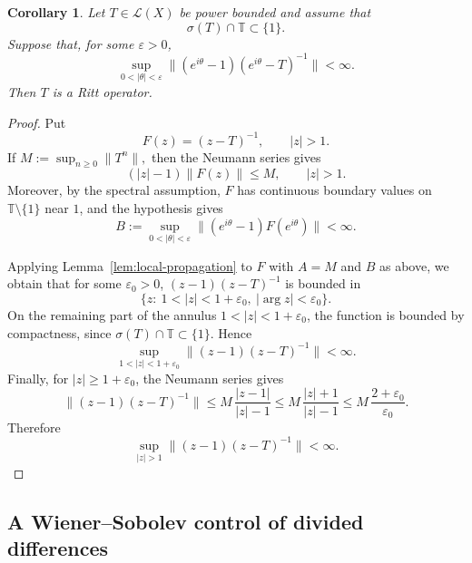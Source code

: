 \documentclass[11pt]{amsart}
\numberwithin{equation}{section}
\newtheorem{corollary}[theorem]{Corollary}
\theoremstyle{definition}
\theoremstyle{plain}
\def\T{\mathbb{T}}
\def\L{L}
\renewcommand{\L}{\mathcal L}
\begin{document}
\begin{corollary}
\label{cor:Lyubich-propagation}
Let \(T\in\L(X)\) be power bounded and assume that
\[
        \sigma(T)\cap\T\subset\{1\}.
\]
Suppose that, for some \(\varepsilon>0\),
\[
        \sup_{0<|\theta|<\varepsilon}
        \|(e^{i\theta}-1)(e^{i\theta}-T)^{-1}\|<\infty .
\]
Then \(T\) is a Ritt operator.
\end{corollary}

\begin{proof}
Put
\[
        F(z)=(z-T)^{-1},\qquad |z|>1.
\]
If
\(
        M:=\sup_{n\ge0}\|T^n\|,
\)
then the Neumann series gives
\[
        (|z|-1)\|F(z)\|\le M,\qquad |z|>1.
\]
Moreover, by the spectral assumption, \(F\) has continuous boundary values on
\(\T\setminus\{1\}\) near \(1\), and the hypothesis gives
\[
B:=
\sup_{0<|\theta|<\varepsilon}
\|(e^{i\theta}-1)F(e^{i\theta})\|<\infty.
\]

Applying Lemma~\ref{lem:local-propagation} to \(F\) with $A=M$ and $B$ as above, we obtain that for some $\varepsilon_0>0$, 
\((z-1)(z-T)^{-1}\) is bounded in
\[
        \{z:\ 1<|z|<1+\varepsilon_0,\ |\arg z|<\varepsilon_0\}.
\]
On the remaining part of the annulus \(1<|z|<1+\varepsilon_0\), the function
is bounded by compactness, since \(\sigma(T)\cap\T\subset\{1\}\). Hence
\[
        \sup_{1<|z|<1+\varepsilon_0}
        \|(z-1)(z-T)^{-1}\|<\infty .
\]
Finally, for \(|z|\ge 1+\varepsilon_0\), the Neumann series gives
\[
        \|(z-1)(z-T)^{-1}\|
        \le
        M\,\frac{|z-1|}{|z|-1}
        \le
        M\,\frac{|z|+1}{|z|-1}
        \le
        M\,\frac{2+\varepsilon_0}{\varepsilon_0}.
\]
Therefore
\[
        \sup_{|z|>1}\|(z-1)(z-T)^{-1}\|<\infty .
\]
\end{proof}



\subsection{A Wiener--Sobolev control of divided differences}\label{subsec:divdiff}
\end{document}
